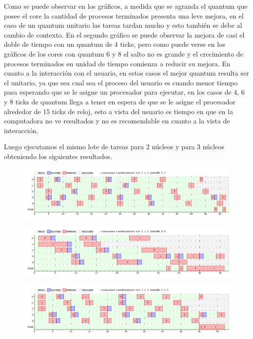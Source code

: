 Como se puede observar en los gráficos, a medida que se agranda el quantum que posee el core la cantidad de procesos terminados presenta una leve mejora, en el caso de un quantum unitario las tareas tardan mucho y esto también se debe al cambio de contexto. En el segundo gráfico se puede observar la mejora de casi el doble de tiempo con un quantum de 4 ticks, pero como puede verse en los gráficos de los cores con quantum 6 y 8 el salto no es grande y el crecimiento de procesos terminados en unidad de tiempo comienza a reducir su mejora.
En cuanto a la interacción con el usuario, en estos casos el mejor quantum resulta ser el unitario, ya que sea cual sea el proceso del usuario es cuando menor tiempo pasa esperando que se le asigne un procesador para ejecutar, en los casos de 4, 6 y 8 ticks de quantum llega a tener en espera de que se le asigne el procesador alrededor de 15 ticks de reloj, esto a vista del usuario es tiempo en que en la computadora no ve resultados y no es recomendable en cuanto a la vista de interacción.

Luego ejecutamos el mismo lote de tareas para 2 núcleos y para 3 núcleos obteniendo los siguientes resultados.


\begin{figure}[H]
  \centering
\includegraphics[scale=0.45]{graficos/ejercicio7/2testTask1.png}
  \caption[Task Batch con un nucleo y quantum 6]{}
\end{figure}


\begin{figure}[H]
  \centering
\includegraphics[scale=0.45]{graficos/ejercicio7/2testTask3.png}
  \caption[Task Batch con un nucleo y quantum 6]{}
\end{figure}


\begin{figure}[H]
  \centering
\includegraphics[scale=0.45]{graficos/ejercicio7/3testTask3.png}
  \caption[Task Batch con un nucleo y  quantum 8]{}
\end{figure}


